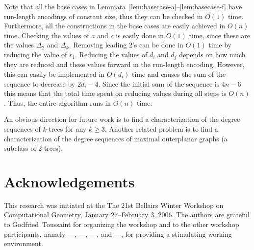 \documentclass[lotsofwhite,charterfonts]{patmorin}
\begin{document}
Note that all the base cases in
Lemmata~\ref{lem:basecase-a}--\ref{lem:basecase-f} have run-length
encodings of constant size, thus they can be checked in $O(1)$ time.
Furthermore, all the constructions in the base cases are easily
achieved in $O(n)$ time.  Checking the values of $a$ and $c$ is easily
done in $O(1)$ time, since these are the values $\Delta_2$ and
$\Delta_k$.  Removing leading 2's can be done in $O(1)$ time by
reducing the value of $r_1$.  Reducing the values of $d_i$ and $d_j$
depends on how much they are reduced and these values forward
in the run-length encoding.  However, this can easily be implemented
in $O(d_i)$ time and causes the sum of the sequence to decrease by
$2d_i-4$.  Since the initial sum of the sequence is $4n-6$ this means
that the total time spent on reducing values during all steps is
$O(n)$.  Thus, the entire algorithm runs in $O(n)$ time.

An obvious direction for future work is to find a characterization of
the degree sequences of $k$-trees for any $k\ge 3$.  Another related
problem is to find a characterization of the degree sequences of
maximal outerplanar graphs (a subclass of 2-trees).

\section{Acknowledgements}

This research was initiated at the The 21st Bellairs Winter Workshop
on Computational Geometry, January 27--February 3, 2006.  The authors
are grateful to Godfried~Toussaint for organizing the workshop and to
the other workshop participants, namely
---,
---,
---, and
---,
for providing a stimulating working environment.




\end{document}
